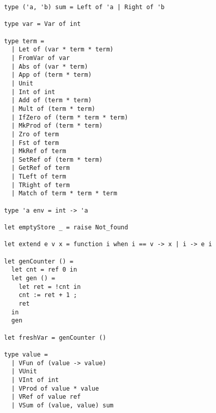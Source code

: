 \begin{figure}[H]
\begin{verbatim}
type ('a, 'b) sum = Left of 'a | Right of 'b

type var = Var of int

type term =
  | Let of (var * term * term)
  | FromVar of var
  | Abs of (var * term)
  | App of (term * term)
  | Unit
  | Int of int
  | Add of (term * term)
  | Mult of (term * term)
  | IfZero of (term * term * term)
  | MkProd of (term * term)
  | Zro of term
  | Fst of term
  | MkRef of term
  | SetRef of (term * term)
  | GetRef of term
  | TLeft of term
  | TRight of term
  | Match of term * term * term

type 'a env = int -> 'a

let emptyStore _ = raise Not_found

let extend e v x = function i when i == v -> x | i -> e i

let genCounter () =
  let cnt = ref 0 in
  let gen () =
    let ret = !cnt in
    cnt := ret + 1 ;
    ret
  in
  gen

let freshVar = genCounter ()

type value =
  | VFun of (value -> value)
  | VUnit
  | VInt of int
  | VProd of value * value
  | VRef of value ref
  | VSum of (value, value) sum
\end{verbatim}
\end{figure}

